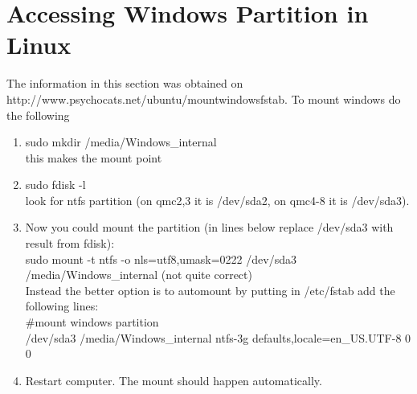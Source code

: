 \documentclass[12pt]{article}
\begin{document}
\section{Accessing Windows Partition in Linux}
The information in this section was obtained on http://www.psychocats.net/ubuntu/mountwindowsfstab.
To mount windows do the following
\begin{enumerate}
\item sudo mkdir /media/Windows\_internal \\this makes the mount point
\item sudo fdisk -l \\ look for ntfs partition (on qmc2,3 it is /dev/sda2, on qmc4-8 it is /dev/sda3).
\item Now you could mount the partition (in lines below replace /dev/sda3 with result from fdisk): \\
  sudo mount -t ntfs -o nls=utf8,umask=0222 /dev/sda3 /media/Windows\_internal (not quite correct)\\
  Instead the better option is to automount by putting in /etc/fstab add the following lines: \\
  \#mount windows partition                                   \\
  /dev/sda3 /media/Windows\_internal ntfs-3g defaults,locale=en\_US.UTF-8 0 0
\item Restart computer. The mount should happen automatically.
\end{enumerate}





\end{document}
